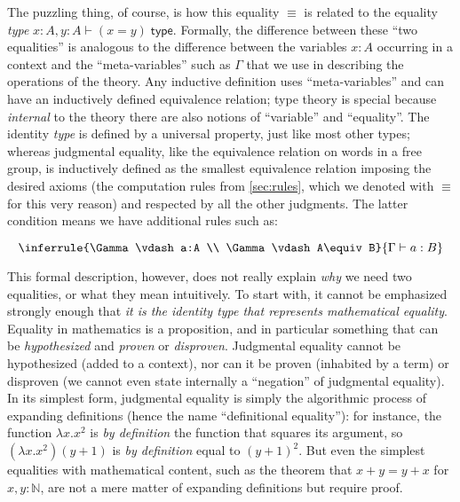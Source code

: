 \documentclass[12pt]{article}
\let\jdeq\equiv
\def\ty{\;\mathsf{type}}
\def\N{\mathbb{N}}
\def\types{\vdash}
\def\equiv{\mathsf{Equiv}}
\numberwithin{equation}{section}
\begin{document}
\begin{subappendices}
The puzzling thing, of course, is how this equality $\jdeq$ is related to the equality \emph{type} $x:A,y:A \types (x=y)\ty$.
Formally, the difference between these ``two equalities'' is analogous to the difference between the variables $x:A$ occurring in a context and the ``meta-variables'' such as $\Gamma$ that we use in describing the operations of the theory.
Any inductive definition uses ``meta-variables'' and can have an inductively defined equivalence relation; type theory is special because \emph{internal} to the theory there are also notions of ``variable'' and ``equality''.
The identity \emph{type} is defined by a universal property, just like most other types; whereas judgmental equality, like the equivalence relation on words in a free group, is inductively defined as the smallest equivalence relation imposing the desired axioms (the computation rules from \cref{sec:rules}, which we denoted with $\jdeq$ for this very reason) and respected by all the other judgments.
The latter condition means we have additional rules such as:
\begin{equation}
  \label{eq:coe}
  \inferrule{\Gamma \types a:A \\ \Gamma\types A\jdeq B}{\Gamma\types a:B}
\end{equation}

This formal description, however, does not really explain \emph{why} we need two equalities, or what they mean intuitively.
To start with, it cannot be emphasized strongly enough that \emph{it is the identity type that represents mathematical equality}.
Equality in mathematics is a proposition, and in particular something that can be \emph{hypothesized} and \emph{proven} or \emph{disproven}.
Judgmental equality cannot be hypothesized (added to a context), nor can it be proven (inhabited by a term) or disproven (we cannot even state internally a ``negation'' of judgmental equality).
In its simplest form, judgmental equality is simply the algorithmic process of expanding definitions (hence the name ``definitional equality''): for instance, the function $\lambda x.x^2$ is \emph{by definition} the function that squares its argument, so $(\lambda x.x^2)(y+1)$ is \emph{by definition} equal to $(y+1)^2$.
But even the simplest equalities with mathematical content, such as the theorem that $x+y=y+x$ for $x,y:\N$, are not a mere matter of expanding definitions but require proof.


\end{subappendices}
\end{document}
